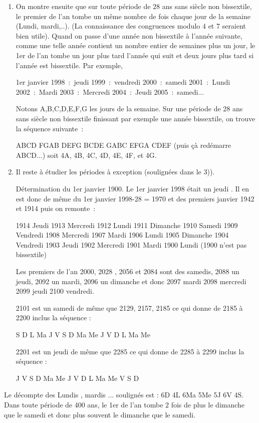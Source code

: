 {{\begin{enumerate}
\item  On montre ensuite que sur toute période de $28$ ans sans siècle non bissextile, le premier de l'an tombe un même nombre de fois chaque jour de la semaine (Lundi, mardi,..). (La connaissance des congruences modulo $4$ et $7$ seraient bien utile). Quand on passe d'une année non bissextile à l'année suivante, comme une telle année contient un nombre entier de semaines plus un jour, le 1er de l'an tombe un jour plus tard l'année qui suit et deux jours plus tard si l'année est bissextile. Par exemple,

1er janvier 1998~:~jeudi  1999~:~vendredi  2000~:~samedi  2001~:~Lundi  2002~:~Mardi 2003~:~Mercredi 2004~:~Jeudi 2005~:~samedi...

Notons A,B,C,D,E,F,G les jours de la semaine. Sur une période de 28 ans sans siècle non bissextile finissant par exemple une année bissextile, on trouve la séquence suivante~:

ABCD FGAB DEFG BCDE GABC EFGA CDEF (puis çà redémarre ABCD...) soit 4A, 4B, 4C, 4D, 4E, 4F, et 4G.

\item  Il reste à étudier les périodes à exception (soulignées dans le 3)).

Détermination du 1er janvier 1900.
Le 1er janvier 1998 était un jeudi . Il en est donc de même du 1er janvier 1998-28 = 1970 et des premiers janvier 1942 et 1914 puis on remonte~:

1914 Jeudi 1913 Mercredi 1912 Lundi 1911 Dimanche 1910 Samedi 1909 Vendredi 1908 Mercredi 1907 Mardi
1906 Lundi 1905 Dimanche 1904 Vendredi 1903 Jeudi 1902 Mercredi 1901 Mardi 1900 Lundi (1900 n'est pas bissextile)

Les premiers de l'an 2000, 2028 , 2056 et 2084 sont des samedis, 2088 un jeudi, 2092 un mardi, 2096 un dimanche et donc 2097 mardi 2098 mercredi 2099 jeudi 2100 vendredi.

2101 est un samedi de même que 2129, 2157, 2185 ce qui donne de 2185 à 2200 inclus la séquence :

S D L Ma J V S D Ma Me J V D L Ma Me

2201 est un jeudi de même que 2285 ce qui donne de 2285 à 2299 inclus la séquence :

J V S D Ma Me J V D L Ma Me V S D
\end{enumerate}

Le décompte des Lundis , mardis ... soulignés est : 6D 4L 6Ma 5Me 5J 6V 4S. Dans toute période de 400 ans, le 1er de l'an tombe $2$ fois de plus le dimanche que le samedi et donc plus souvent le dimanche que le samedi.}
}